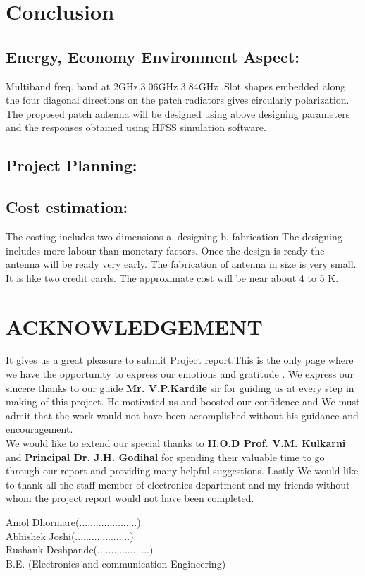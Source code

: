 \documentclass[12pt]{article}
\begin{document}
				

\cleardoublepage

\section{Conclusion}\label{sec:Conclusion}
    \subsection{Energy, Economy Environment Aspect:}\label{sub:Energy, Economy Environment Aspect:}
       Multiband freq. band at 2GHz,3.06GHz  3.84GHz  .Slot shapes embedded along the four diagonal directions on the patch radiators gives circularly polarization. The proposed patch antenna will be designed using above designing parameters and the responses obtained using HFSS simulation software.
    \subsection{Project Planning:}\label{sub:Project Planning:}

    \subsection{Cost estimation:}\label{sub:Cost estimation:}
      The costing includes two dimensions
      a.  designing
      b. fabrication
      The designing includes more labour than monetary factors. Once the design is ready the antenna will be ready very early.  The fabrication of antenna in size is very small.  It is like two credit cards.
      The approximate cost will be near about 4 to 5 K.
\cleardoublepage

\section{ACKNOWLEDGEMENT}
  \justify
	It gives us a great pleasure to submit  Project report.This is the only page where we have the opportunity to express our emotions and gratitude . We express our sincere thanks to our guide \textbf{Mr. V.P.Kardile} sir for guiding us at every step in making of this project. He motivated us and boosted our confidence and We must admit that the work would not have been accomplished without his guidance and encouragement. \\ 
	
	
	We would like to extend our special thanks to \textbf{H.O.D Prof. V.M. Kulkarni} and \textbf{Principal Dr. J.H. Godihal} for spending their valuable time to go through our report and providing many helpful suggestions. Lastly We would like to thank all the staff member of electronics department and my friends without whom the project report would not have been completed.\\
	 
	 
	 \begin{flushright}
	 	Amol Dhormare(.....................) \\
	 	Abhishek Joshi(....................) \\
	 	Rushank Deshpande(...................) \\
	 	B.E. (Electronics and communication Engineering) \\	 	
	 \end{flushright}
	 

	    
\end{document}
